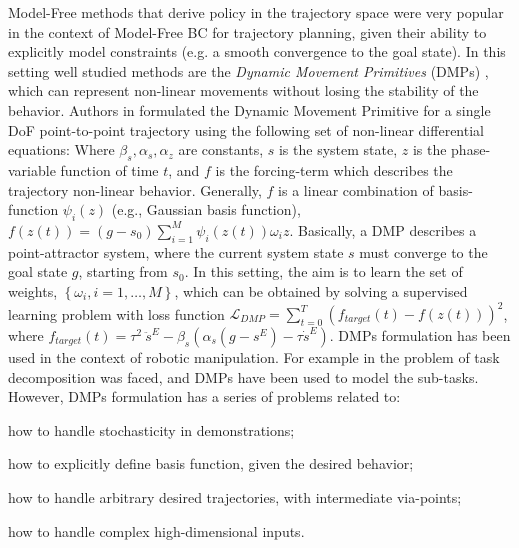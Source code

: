 Model-Free methods that derive policy in the trajectory space were very popular in the context of Model-Free BC for trajectory planning, given their ability to explicitly model constraints (e.g. a smooth convergence to the goal state). In this setting well studied methods are the \textit{Dynamic Movement Primitives} (DMPs) \cite{ijspeert2002learning,ijspeert2013dynamical}, which can represent non-linear movements without losing the stability of the behavior.
Authors in \cite{ijspeert2013dynamical} formulated the Dynamic Movement Primitive for a single DoF point-to-point trajectory using the following set of non-linear differential equations:  Where $\beta_{s}, \alpha_{s}, \alpha_{z}$ are constants, $s$ is the system state, $z$ is the phase-variable function of time $t$, and $f$ is the forcing-term which describes the trajectory non-linear behavior. Generally, $f$ is a linear combination of basis-function $\psi_{i}(z)$ (e.g., Gaussian basis function), $f(z(t)) = (g-s_{0}) \sum_{i=1}^{M}\psi_{i}(z(t))\omega_{i}z$. Basically, a DMP describes a point-attractor system, where the current system state $s$ must converge to the goal state $g$, starting from $s_{0}$. In this setting, the aim is to learn the set of weights, $\left\{\omega_{i}, i=1,\dots,M\right\}$, which can be obtained by solving a supervised learning problem with loss function $\mathcal{L}_{DMP} = \sum_{t=0}^{T}(f_{target}(t) - f(z(t)))^{2}$, where $f_{target}(t) = \tau^{2} \ \ddot{s}^{E} - \beta_{s}(\alpha_{s}(g - s^{E})-\tau \dot{s}^{E})$. DMPs formulation has been used in the context of robotic manipulation. For example in \cite{meier2011movement_primitive,caccavale2019kinesthetic,agostini2020manipulation} the problem of task decomposition was faced, and DMPs have been used to model the sub-tasks. However, DMPs formulation has a series of problems related to: \begin{enumerate*}[label=(\textbf{\alph*})]
    \item how to handle stochasticity in demonstrations;
    \item how to explicitly define basis function, given the desired behavior;
    \item how to handle arbitrary desired trajectories, with intermediate via-points;
    \item how to handle complex high-dimensional inputs.
\end{enumerate*}
